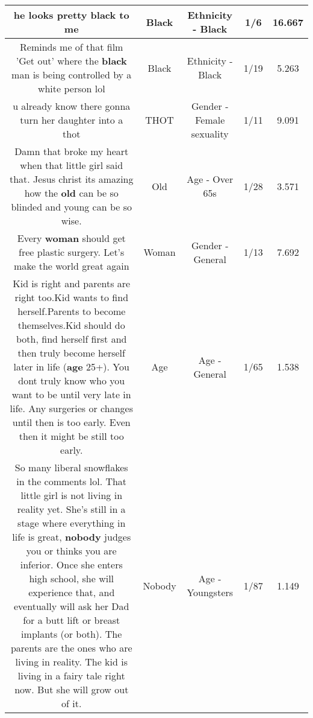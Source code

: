 \documentclass[11pt]{article}
\newlength\mylength
\begin{document}
\begin{center}
\begin{longtable}{|C{.65\mylength}|C{.30\mylength}|C{.12\mylength}|C{.12\mylength}|C{.12\mylength}|}
  \small he looks pretty \textbf{black} to me\normalsize   & Black & Ethnicity - Black & 1/6 & 16.667 \\  \hline
  \small Reminds me of that film 'Get out' where the \textbf{black} man is being controlled by a white person lol\normalsize   & Black & Ethnicity - Black & 1/19 & 5.263 \\  \hline
  \small u already know there gonna turn her daughter into a thot\normalsize   & THOT & Gender - Female sexuality & 1/11 & 9.091 \\  \hline
  \small Damn that broke my heart when that little girl said that. Jesus christ its amazing how the \textbf{old} can be so blinded and young can be so wise.\normalsize   & Old & Age - Over 65s & 1/28 & 3.571 \\  \hline
  \small Every \textbf{woman} should get free plastic surgery. Let's make the world great again\normalsize   & Woman & Gender - General & 1/13 & 7.692 \\  \hline
  \small Kid is right and parents are right too.Kid wants to find herself.Parents to become themselves.Kid should do both, find herself first and then truly become herself later in life (\textbf{age} 25+). You dont truly know who you want to be until very late in life. Any surgeries or changes until then is too early. Even then it might be still too early.\normalsize   & Age & Age - General & 1/65 & 1.538 \\  \hline
  \small So many liberal snowflakes in the comments lol. That little girl is not living in reality yet. She's still in a stage where everything in life is great, \textbf{nobody} judges you or thinks you are inferior. Once she enters high school, she will experience that, and eventually will ask her Dad for a butt lift or breast implants (or both). The parents are the ones who are living in reality. The kid is living in a fairy tale right now. But she will grow out of it.\normalsize   & Nobody & Age - Youngsters & 1/87 & 1.149 \\  \hline

\end{longtable}
\end{center}
\end{document}
